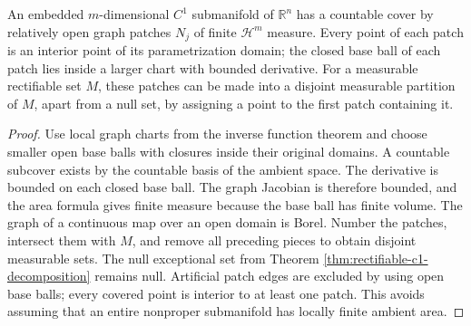 \begin{lemma}\label{lem:finite-area-c1-patches}
An embedded $m$-dimensional $C^1$ submanifold of $\mathbb R^n$ has a countable cover by relatively open graph patches $N_j$ of finite $\mathcal H^m$ measure. Every point of each patch is an interior point of its parametrization domain; the closed base ball of each patch lies inside a larger chart with bounded derivative. For a measurable rectifiable set $M$, these patches can be made into a disjoint measurable partition of $M$, apart from a null set, by assigning a point to the first patch containing it.
\end{lemma}
\begin{proof}
Use local graph charts from the inverse function theorem and choose smaller open base balls with closures inside their original domains. A countable subcover exists by the countable basis of the ambient space. The derivative is bounded on each closed base ball. The graph Jacobian is therefore bounded, and the area formula gives finite measure because the base ball has finite volume. The graph of a continuous map over an open domain is Borel. Number the patches, intersect them with $M$, and remove all preceding pieces to obtain disjoint measurable sets. The null exceptional set from Theorem \ref{thm:rectifiable-c1-decomposition} remains null. Artificial patch edges are excluded by using open base balls; every covered point is interior to at least one patch. This avoids assuming that an entire nonproper submanifold has locally finite ambient area.
\end{proof}
